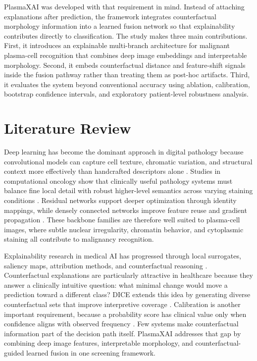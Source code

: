 \documentclass[runningheads]{llncs}
\begin{document}
PlasmaXAI was developed with that requirement in mind. Instead of attaching explanations after prediction, the framework integrates counterfactual morphology information into a learned fusion network so that explainability contributes directly to classification. The study makes three main contributions. First, it introduces an explainable multi-branch architecture for malignant plasma-cell recognition that combines deep image embeddings and interpretable morphology. Second, it embeds counterfactual distance and feature-shift signals inside the fusion pathway rather than treating them as post-hoc artifacts. Third, it evaluates the system beyond conventional accuracy using ablation, calibration, bootstrap confidence intervals, and exploratory patient-level robustness analysis.

\section{Literature Review}
Deep learning has become the dominant approach in digital pathology because convolutional models can capture cell texture, chromatic variation, and structural context more effectively than handcrafted descriptors alone \cite{litjens,janowczyk}. Studies in computational oncology show that clinically useful pathology systems must balance fine local detail with robust higher-level semantics across varying staining conditions \cite{bera,campanella}. Residual networks support deeper optimization through identity mappings, while densely connected networks improve feature reuse and gradient propagation \cite{resnet,densenet}. These backbone families are therefore well suited to plasma-cell images, where subtle nuclear irregularity, chromatin behavior, and cytoplasmic staining all contribute to malignancy recognition.

Explainability research in medical AI has progressed through local surrogates, saliency maps, attribution methods, and counterfactual reasoning \cite{lime,gradcam,shap,wachter}. Counterfactual explanations are particularly attractive in healthcare because they answer a clinically intuitive question: what minimal change would move a prediction toward a different class? DICE extends this idea by generating diverse counterfactual sets that improve interpretive coverage \cite{diceml}. Calibration is another important requirement, because a probability score has clinical value only when confidence aligns with observed frequency \cite{calibration}. Few systems make counterfactual information part of the decision path itself. PlasmaXAI addresses that gap by combining deep image features, interpretable morphology, and counterfactual-guided learned fusion in one screening framework.
\end{document}
